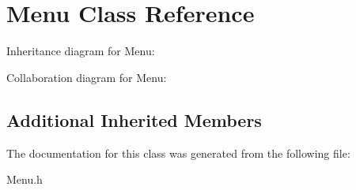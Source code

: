 \hypertarget{classMenu}{}\section{Menu Class Reference}
\label{classMenu}


Inheritance diagram for Menu\+:


Collaboration diagram for Menu\+:
\subsection*{Additional Inherited Members}


The documentation for this class was generated from the following file\+:\begin{DoxyCompactItemize}
\item 
Menu.\+h\end{DoxyCompactItemize}
